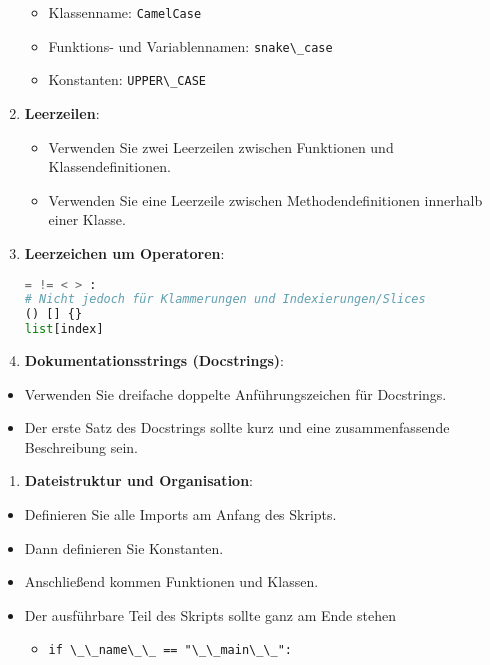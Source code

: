\documentclass{vorlage-design-main}
\begin{document}
\begin{enumerate}
  \begin{itemize}
  
  \item
    Klassenname: \verb|CamelCase|
  \item
    Funktions- und Variablennamen: \verb|snake\_case|
  \item
    Konstanten: \verb|UPPER\_CASE|
  \end{itemize}
\item
  \textbf{Leerzeilen}:

  \begin{itemize}
  
  \item
    Verwenden Sie zwei Leerzeilen zwischen Funktionen und
    Klassendefinitionen.
  \item
    Verwenden Sie eine Leerzeile zwischen Methodendefinitionen innerhalb
    einer Klasse.
  \end{itemize}
\item
  \textbf{Leerzeichen um Operatoren}:

\begin{lstlisting}[language=Python]
= != < > :
# Nicht jedoch für Klammerungen und Indexierungen/Slices
() [] {}
list[index]
\end{lstlisting}
\item
  \textbf{Dokumentationsstrings (Docstrings)}:
\end{enumerate}

\begin{itemize}

\item
  Verwenden Sie dreifache doppelte Anführungszeichen für Docstrings.
\item
  Der erste Satz des Docstrings sollte kurz und eine zusammenfassende
  Beschreibung sein.
\end{itemize}

\begin{enumerate}
\def\labelenumi{\arabic{enumi}.}
\setcounter{enumi}{9}

\item
  \textbf{Dateistruktur und Organisation}:
\end{enumerate}

\begin{itemize}

\item
  Definieren Sie alle Imports am Anfang des Skripts.
\item
  Dann definieren Sie Konstanten.
\item
  Anschließend kommen Funktionen und Klassen.
\item
  Der ausführbare Teil des Skripts sollte ganz am Ende stehen

  \begin{itemize}
  
  \item
    \verb|if \_\_name\_\_ == "\_\_main\_\_":|
  \end{itemize}
\end{itemize}
\end{document}
